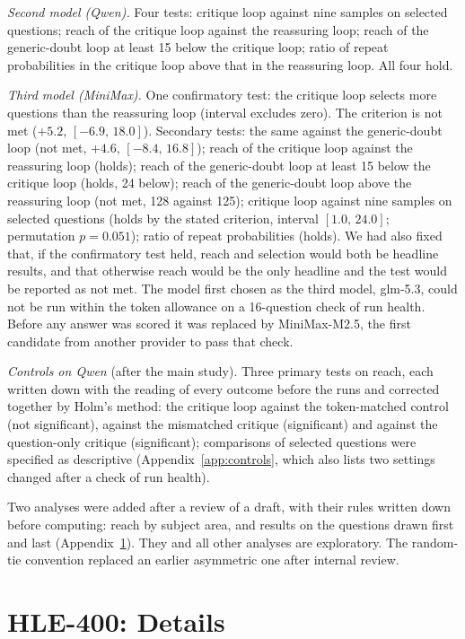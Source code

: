 \documentclass[11pt]{article}
\newcommand{\qw}{Qwen}
\newcommand{\mm}{MiniMax}
\newcommand{\ci}[2]{$[#1,\,#2]$}
\begin{document}
\emph{Second model (\qw).}
Four tests: critique loop against nine samples on selected questions; reach of the critique loop against the reassuring loop; reach of the generic-doubt loop at least 15 below the critique loop; ratio of repeat probabilities in the critique loop above that in the reassuring loop.
All four hold.

\emph{Third model (\mm).}
One confirmatory test: the critique loop selects more questions than the reassuring loop (interval excludes zero).
The criterion is not met ($+5.2$, \ci{-6.9}{18.0}).
Secondary tests: the same against the generic-doubt loop (not met, $+4.6$, \ci{-8.4}{16.8}); reach of the critique loop against the reassuring loop (holds); reach of the generic-doubt loop at least 15 below the critique loop (holds, 24 below); reach of the generic-doubt loop above the reassuring loop (not met, 128 against 125); critique loop against nine samples on selected questions (holds by the stated criterion, interval \ci{1.0}{24.0}; permutation $p=0.051$); ratio of repeat probabilities (holds).
We had also fixed that, if the confirmatory test held, reach and selection would both be headline results, and that otherwise reach would be the only headline and the test would be reported as not met.
The model first chosen as the third model, glm-5.3, could not be run within the token allowance on a 16-question check of run health. Before any answer was scored it was replaced by MiniMax-M2.5, the first candidate from another provider to pass that check.

\emph{Controls on \qw} (after the main study).
Three primary tests on reach, each written down with the reading of every outcome before the runs and corrected together by Holm's method: the critique loop against the token-matched control (not significant), against the mismatched critique (significant) and against the question-only critique (significant); comparisons of selected questions were specified as descriptive (Appendix~\ref{app:controls}, which also lists two settings changed after a check of run health).

Two analyses were added after a review of a draft, with their rules written down before computing: reach by subject area, and results on the questions drawn first and last (Appendix~\ref{app:more}).
They and all other analyses are exploratory.
The random-tie convention replaced an earlier asymmetric one after internal review.

\section{HLE-400: Details}
\label{app:more}
\label{app:first}
\end{document}
